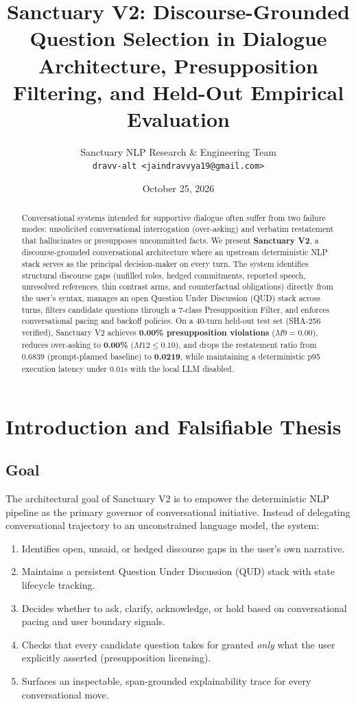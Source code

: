 \documentclass[11pt,a4paper]{article}
\title{\textbf{Sanctuary V2: Discourse-Grounded Question Selection in Dialogue}\\
\large Architecture, Presupposition Filtering, and Held-Out Empirical Evaluation}
\author{Sanctuary NLP Research \& Engineering Team \\
\texttt{dravv-alt <jaindravvya19@gmail.com>}}
\date{October 25, 2026}
\begin{document}
\maketitle

\begin{abstract}
Conversational systems intended for supportive dialogue often suffer from two failure modes: unsolicited conversational interrogation (over-asking) and verbatim restatement that hallucinates or presupposes uncommitted facts. We present \textbf{Sanctuary V2}, a discourse-grounded conversational architecture where an upstream deterministic NLP stack serves as the principal decision-maker on every turn. The system identifies structural discourse gaps (unfilled roles, hedged commitments, reported speech, unresolved references, thin contrast arms, and counterfactual obligations) directly from the user's syntax, manages an open Question Under Discussion (QUD) stack across turns, filters candidate questions through a 7-class Presupposition Filter, and enforces conversational pacing and backoff policies. On a 40-turn held-out test set (SHA-256 verified), Sanctuary V2 achieves \textbf{0.00\% presupposition violations} ($M9 = 0.00$), reduces over-asking to \textbf{0.00\%} ($M12 \le 0.10$), and drops the restatement ratio from $0.6839$ (prompt-planned baseline) to \textbf{0.0219}, while maintaining a deterministic p95 execution latency under $0.01$s with the local LLM disabled.
\end{abstract}

\section{Introduction and Falsifiable Thesis}

\subsection{Goal}
The architectural goal of Sanctuary V2 is to empower the deterministic NLP pipeline as the primary governor of conversational initiative. Instead of delegating conversational trajectory to an unconstrained language model, the system:
\begin{enumerate}
    \item Identifies open, unsaid, or hedged discourse gaps in the user's own narrative.
    \item Maintains a persistent Question Under Discussion (QUD) stack with state lifecycle tracking.
    \item Decides whether to ask, clarify, acknowledge, or hold based on conversational pacing and user boundary signals.
    \item Checks that every candidate question takes for granted \emph{only} what the user explicitly asserted (presupposition licensing).
    \item Surfaces an inspectable, span-grounded explainability trace for every conversational move.
\end{enumerate}
\end{document}
